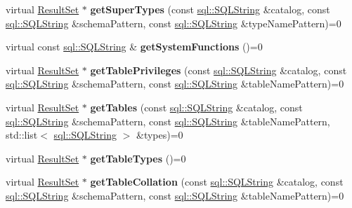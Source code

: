 \begin{DoxyCompactItemize}
virtual \hyperlink{classsql_1_1_result_set}{Result\+Set} $\ast$ {\bfseries get\+Super\+Types} (const \hyperlink{classsql_1_1_s_q_l_string}{sql\+::\+S\+Q\+L\+String} \&catalog, const \hyperlink{classsql_1_1_s_q_l_string}{sql\+::\+S\+Q\+L\+String} \&schema\+Pattern, const \hyperlink{classsql_1_1_s_q_l_string}{sql\+::\+S\+Q\+L\+String} \&type\+Name\+Pattern)=0
\item 
\hypertarget{classsql_1_1_database_meta_data_af1d38d4907354e79b65dff8f39b6b58c}{}\label{classsql_1_1_database_meta_data_af1d38d4907354e79b65dff8f39b6b58c} 
virtual const \hyperlink{classsql_1_1_s_q_l_string}{sql\+::\+S\+Q\+L\+String} \& {\bfseries get\+System\+Functions} ()=0
\item 
\hypertarget{classsql_1_1_database_meta_data_af79b09cf6116f630f2040d9f5e328ede}{}\label{classsql_1_1_database_meta_data_af79b09cf6116f630f2040d9f5e328ede} 
virtual \hyperlink{classsql_1_1_result_set}{Result\+Set} $\ast$ {\bfseries get\+Table\+Privileges} (const \hyperlink{classsql_1_1_s_q_l_string}{sql\+::\+S\+Q\+L\+String} \&catalog, const \hyperlink{classsql_1_1_s_q_l_string}{sql\+::\+S\+Q\+L\+String} \&schema\+Pattern, const \hyperlink{classsql_1_1_s_q_l_string}{sql\+::\+S\+Q\+L\+String} \&table\+Name\+Pattern)=0
\item 
\hypertarget{classsql_1_1_database_meta_data_a4f5e31c5487e52d4d8cac5834b8b717e}{}\label{classsql_1_1_database_meta_data_a4f5e31c5487e52d4d8cac5834b8b717e} 
virtual \hyperlink{classsql_1_1_result_set}{Result\+Set} $\ast$ {\bfseries get\+Tables} (const \hyperlink{classsql_1_1_s_q_l_string}{sql\+::\+S\+Q\+L\+String} \&catalog, const \hyperlink{classsql_1_1_s_q_l_string}{sql\+::\+S\+Q\+L\+String} \&schema\+Pattern, const \hyperlink{classsql_1_1_s_q_l_string}{sql\+::\+S\+Q\+L\+String} \&table\+Name\+Pattern, std\+::list$<$ \hyperlink{classsql_1_1_s_q_l_string}{sql\+::\+S\+Q\+L\+String} $>$ \&types)=0
\item 
\hypertarget{classsql_1_1_database_meta_data_ac131128f2863420bba3bcb75ee4f76e1}{}\label{classsql_1_1_database_meta_data_ac131128f2863420bba3bcb75ee4f76e1} 
virtual \hyperlink{classsql_1_1_result_set}{Result\+Set} $\ast$ {\bfseries get\+Table\+Types} ()=0
\item 
\hypertarget{classsql_1_1_database_meta_data_ac9a86a8540d7f314a5f83b6a06e610d9}{}\label{classsql_1_1_database_meta_data_ac9a86a8540d7f314a5f83b6a06e610d9} 
virtual \hyperlink{classsql_1_1_result_set}{Result\+Set} $\ast$ {\bfseries get\+Table\+Collation} (const \hyperlink{classsql_1_1_s_q_l_string}{sql\+::\+S\+Q\+L\+String} \&catalog, const \hyperlink{classsql_1_1_s_q_l_string}{sql\+::\+S\+Q\+L\+String} \&schema\+Pattern, const \hyperlink{classsql_1_1_s_q_l_string}{sql\+::\+S\+Q\+L\+String} \&table\+Name\+Pattern)=0

\end{DoxyCompactItemize}
